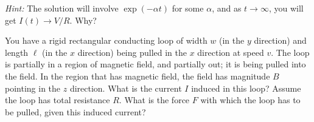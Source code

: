 \documentclass[12pt]{article}
\begin{document}
\textsl{Hint:} The solution will involve $\exp(-\alpha t)$ for some
$\alpha$, and as $t\rightarrow\infty$, you will get $I(t)\rightarrow
V/R$. Why?

\startproblem%
You have a rigid rectangular
conducting loop of width $w$ (in the $y$ direction) and length $\ell$
(in the $x$ direction) being pulled in the $x$ direction at speed
$v$. The loop is partially in a region of magnetic field, and
partially out; it is being pulled into the field. In
the region that has magnetic field, the field has magnitude $B$
pointing in the $z$ direction. What is the current $I$ induced in this
loop? Assume the loop has total resistance $R$.
What is the force $F$ with which the loop has to be pulled, given this induced current?
\end{document}
